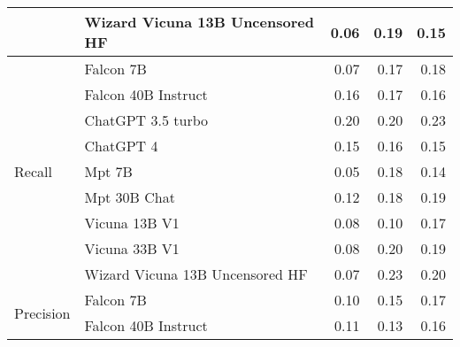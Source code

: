 \begin{table}[!htbp]
\begin{tabular}{l|l|rrr}
&Wizard Vicuna 13B Uncensored HF & {\cellcolor[HTML]{E9F7E5}} \color[HTML]{000000} 0.06 & {\cellcolor[HTML]{00441B}} \color[HTML]{F1F1F1} 0.19 & {\cellcolor[HTML]{278F48}} \color[HTML]{F1F1F1} 0.15 \\
\midrule
\multirow{9}{*}{Recall}  & Falcon 7B & {\cellcolor[HTML]{FEE6CE}} \color[HTML]{000000} 0.07 & {\cellcolor[HTML]{EE6410}} \color[HTML]{F1F1F1} 0.17 & {\cellcolor[HTML]{E05206}} \color[HTML]{F1F1F1} 0.18 \\
&Falcon 40B Instruct & {\cellcolor[HTML]{F3701B}} \color[HTML]{F1F1F1} 0.16 & {\cellcolor[HTML]{F06712}} \color[HTML]{F1F1F1} 0.17 & {\cellcolor[HTML]{F16913}} \color[HTML]{F1F1F1} 0.16 \\
&ChatGPT 3.5 turbo & {\cellcolor[HTML]{B93D02}} \color[HTML]{F1F1F1} 0.20 & {\cellcolor[HTML]{C03F02}} \color[HTML]{F1F1F1} 0.20 & {\cellcolor[HTML]{8B2C04}} \color[HTML]{F1F1F1} 0.23 \\
&ChatGPT 4 & {\cellcolor[HTML]{F9802D}} \color[HTML]{F1F1F1} 0.15 & {\cellcolor[HTML]{F4721E}} \color[HTML]{F1F1F1} 0.16 & {\cellcolor[HTML]{FB8634}} \color[HTML]{F1F1F1} 0.15 \\
&Mpt 7B & {\cellcolor[HTML]{FFF5EB}} \color[HTML]{000000} 0.05 & {\cellcolor[HTML]{DE5005}} \color[HTML]{F1F1F1} 0.18 & {\cellcolor[HTML]{FC8B3A}} \color[HTML]{F1F1F1} 0.14 \\
&Mpt 30B Chat & {\cellcolor[HTML]{FDA35C}} \color[HTML]{000000} 0.12 & {\cellcolor[HTML]{DF5106}} \color[HTML]{F1F1F1} 0.18 & {\cellcolor[HTML]{DB4A02}} \color[HTML]{F1F1F1} 0.19 \\
&Vicuna 13B V1 & {\cellcolor[HTML]{FDD8B2}} \color[HTML]{000000} 0.08 & {\cellcolor[HTML]{FDC692}} \color[HTML]{000000} 0.10 & {\cellcolor[HTML]{E65A0B}} \color[HTML]{F1F1F1} 0.17 \\
&Vicuna 33B V1 & {\cellcolor[HTML]{FEDDBC}} \color[HTML]{000000} 0.08 & {\cellcolor[HTML]{C34002}} \color[HTML]{F1F1F1} 0.20 & {\cellcolor[HTML]{D94801}} \color[HTML]{F1F1F1} 0.19 \\
&Wizard Vicuna 13B Uncensored HF & {\cellcolor[HTML]{FEE6CF}} \color[HTML]{000000} 0.07 & {\cellcolor[HTML]{7F2704}} \color[HTML]{F1F1F1} 0.23 & {\cellcolor[HTML]{B93D02}} \color[HTML]{F1F1F1} 0.20 \\
\midrule
\multirow{9}{*}{Precision} & Falcon 7B & {\cellcolor[HTML]{C1C2DF}} \color[HTML]{000000} 0.10 & {\cellcolor[HTML]{65489F}} \color[HTML]{F1F1F1} 0.15 & {\cellcolor[HTML]{470F84}} \color[HTML]{F1F1F1} 0.17 \\
&Falcon 40B Instruct & {\cellcolor[HTML]{A7A4CE}} \color[HTML]{F1F1F1} 0.11 & {\cellcolor[HTML]{7B74B5}} \color[HTML]{F1F1F1} 0.13 & {\cellcolor[HTML]{582F93}} \color[HTML]{F1F1F1} 0.16 \\

\end{tabular}
\end{table}
